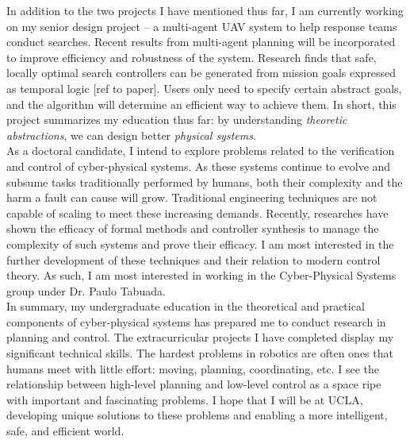 \documentclass[]{article}
\begin{document}
In addition to the two projects I have mentioned thus far, I am currently working on my senior design project -- a multi-agent UAV system to help response teams conduct searches. Recent results from multi-agent planning will be incorporated to improve efficiency and robustness of the system. Research finds that safe, locally optimal search controllers can be generated from mission goals expressed as temporal logic [ref to paper]. Users only need to specify certain abstract goals, and the algorithm will determine an efficient way to achieve them. In short, this project summarizes my education thus far: by understanding \emph{theoretic abstractions}, we can design better \emph{physical systems}.\\

As a doctoral candidate, I intend to explore problems related to the verification and control of cyber-physical systems. As these systems continue to evolve and subsume tasks traditionally performed by humans, both their complexity and the harm a fault can cause will grow. Traditional engineering techniques are not capable of scaling to meet these increasing demands. Recently, researches have shown the efficacy of formal methods and controller synthesis to manage the complexity of such systems and prove their efficacy. I am most interested in the further development of these techniques and their relation to modern control theory. As such, I am most interested in working in the Cyber-Physical Systems group under Dr. Paulo Tabuada.\\

In summary, my undergraduate education in the theoretical and practical components of cyber-physical systems has prepared me to conduct research in planning and control. The extracurricular projects I have completed display my significant technical skills. The hardest problems in robotics are often ones that humans meet with little effort: moving, planning, coordinating, etc. I see the relationship between high-level planning and low-level control as a space ripe with important and fascinating problems. I hope that I will be at UCLA, developing unique solutions to these problems and enabling a more intelligent, safe, and efficient world.

\pagebreak
\end{document}
